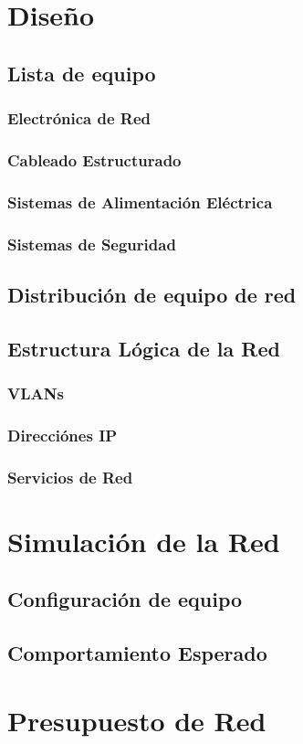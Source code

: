 \section{Diseño}
            \lipsum[1]
    \subsection{Lista de equipo}
            \lipsum[1]
        \subsubsection{Electrónica de Red}
            \lipsum[1]
        \subsubsection{Cableado Estructurado}
            \lipsum[1]
        \subsubsection{Sistemas de Alimentación Eléctrica}
            \lipsum[1]
        \subsubsection{Sistemas de Seguridad}
            \lipsum[1]
    \subsection{Distribución de equipo de red}
            \lipsum[1]
    \subsection{Estructura Lógica de la Red}
            \lipsum[1]
        \subsubsection{VLANs}
            \lipsum[1]
        \subsubsection{Direcciónes IP}
            \lipsum[1]
        \subsubsection{Servicios de Red}
            \lipsum[1]
\section{Simulación de la Red}
            \lipsum[1]
    \subsection{Configuración de equipo}
            \lipsum[1]
    \subsection{Comportamiento Esperado}
            \lipsum[1]
\section{Presupuesto de Red}
            \lipsum[1]
